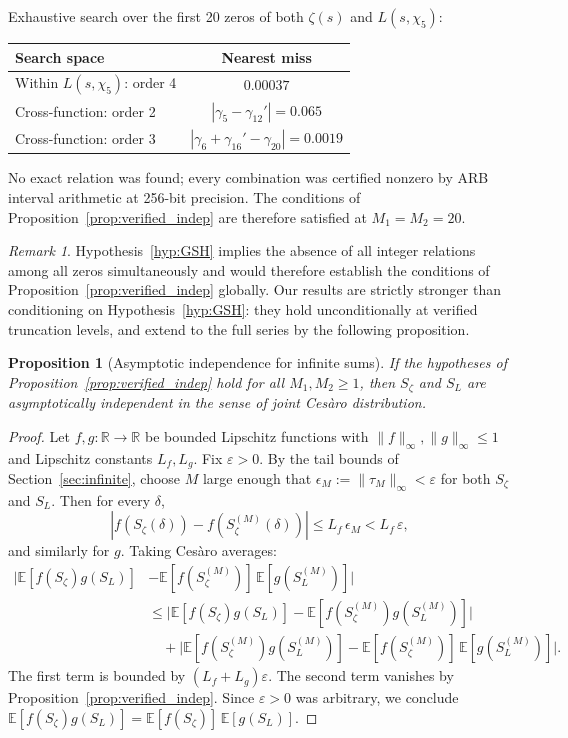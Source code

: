 \documentclass[12pt,reqno]{amsart}
\theoremstyle{plain}
\newtheorem{proposition}[theorem]{Proposition}
\theoremstyle{definition}
\theoremstyle{remark}
\newtheorem{remark}[theorem]{Remark}
\newcommand{\R}{\mathbb{R}}
\newcommand{\E}{\mathbb{E}}
\begin{document}
Exhaustive search over the first 20 zeros of both $\zeta(s)$ and $L(s,\chi_5)$:
\begin{center}
\renewcommand{\arraystretch}{1.1}
\begin{tabular}{lc}
\toprule
Search space & Nearest miss \\
\midrule
Within $L(s,\chi_5)$: order 4 & $0.00037$ \\
Cross-function: order 2 & $|\gamma_5 - \gamma_{12}'| = 0.065$ \\
Cross-function: order 3 & $|\gamma_6+\gamma_{16}'-\gamma_{20}| = 0.0019$ \\
\bottomrule
\end{tabular}
\end{center}

No exact relation was found; every combination was certified nonzero by ARB interval arithmetic at 256-bit precision.  The conditions of Proposition~\ref{prop:verified_indep} are therefore satisfied at $M_1 = M_2 = 20$.

\begin{remark}\label{rem:GSH_context}
Hypothesis~\ref{hyp:GSH} implies the absence of all integer relations among all zeros simultaneously and would therefore establish the conditions of Proposition~\ref{prop:verified_indep} globally.  Our results are strictly stronger than conditioning on Hypothesis~\ref{hyp:GSH}: they hold unconditionally at verified truncation levels, and extend to the full series by the following proposition.
\end{remark}

\begin{proposition}[Asymptotic independence for infinite sums]\label{prop:indep_limit}
If the hypotheses of Proposition~\ref{prop:verified_indep} hold for all $M_1, M_2 \geq 1$, then $S_\zeta$ and $S_L$ are asymptotically independent in the sense of joint Ces\`aro distribution.
\end{proposition}

\begin{proof}
Let $f, g : \R \to \R$ be bounded Lipschitz functions with $\|f\|_\infty, \|g\|_\infty \leq 1$ and Lipschitz constants $L_f, L_g$.  Fix $\varepsilon > 0$.  By the tail bounds of Section~\ref{sec:infinite}, choose $M$ large enough that $\epsilon_M := \|\tau_M\|_\infty < \varepsilon$ for both $S_\zeta$ and $S_L$.  Then for every $\delta$,
\[
  |f(S_\zeta(\delta)) - f(S_\zeta^{(M)}(\delta))| \leq L_f\, \epsilon_M < L_f\, \varepsilon,
\]
and similarly for $g$.  Taking Ces\`aro averages:
\begin{align*}
  \big|\E[f(S_\zeta)g(S_L)] &- \E[f(S_\zeta^{(M)})]\,\E[g(S_L^{(M)})]\big| \\
  &\leq \big|\E[f(S_\zeta)g(S_L)] - \E[f(S_\zeta^{(M)})g(S_L^{(M)})]\big| \\
  &\quad + \big|\E[f(S_\zeta^{(M)})g(S_L^{(M)})] - \E[f(S_\zeta^{(M)})]\,\E[g(S_L^{(M)})]\big|.
\end{align*}
The first term is bounded by $(L_f + L_g)\varepsilon$.  The second term vanishes by Proposition~\ref{prop:verified_indep}.  Since $\varepsilon > 0$ was arbitrary, we conclude $\E[f(S_\zeta)g(S_L)] = \E[f(S_\zeta)]\,\E[g(S_L)]$.
\end{proof}
\end{document}
